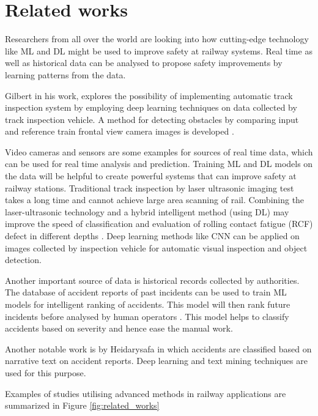 \section{Related works}
Researchers from all over the world are looking into how cutting-edge technology like ML and DL might be used to improve safety at railway systems. Real time as well as historical data can be analysed to propose safety improvements by learning patterns from the data. 

Gilbert in his work, explores the possibility of implementing automatic track inspection system by employing deep learning techniques on data collected by track inspection vehicle.  A method for detecting obstacles by comparing input and reference train frontal view camera images is developed \cite{gilbert_2017}. 

Video cameras and sensors are some examples for sources of real time data, which can be used for real time analysis and prediction. Training ML and DL models on the data will be helpful to create powerful systems that can improve safety at railway stations. Traditional track inspection by laser ultrasonic imaging test takes a long time and cannot achieve large area scanning of rail. Combining the laser-ultrasonic technology and a hybrid intelligent method (using DL) may improve the speed of classification and evaluation of rolling contact fatigue (RCF) defect in different depths \cite{jiang_fast_2019}. Deep learning methods like CNN can be applied on images collected by inspection vehicle for automatic visual inspection and object detection\cite{han_deep_2020}. 

Another important source of data is historical records collected by authorities. The database of accident reports of past incidents can be used to train ML models for intelligent ranking of accidents. This model will then rank future incidents before analysed by human operators \cite{bikov_railway_2017}. This model helps to classify accidents based on severity and hence ease the manual work. 

Another notable work is by Heidarysafa \cite{heidarysafa_analysis_2018} in which accidents are classified based on narrative text on accident reports. Deep learning and text mining techniques are used for this purpose.

Examples of studies utilising advanced methods in railway applications are summarized in Figure \ref{fig:related_works}

